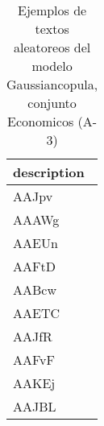 \begin{table}[H]
\centering
\fontsize{8}{14}\selectfont
\caption{Ejemplos de textos aleatoreos del modelo Gaussiancopula, conjunto Economicos (A-3)}
\label{table-sample10-economicos-a-3-gaussiancopula-text}
\begin{tabular}{|m{50em}|}
\hline
\rowcolor[gray]{0.8}
description \\
\hline AAJpv \\
\hline AAAWg \\
\hline AAEUn \\
\hline AAFtD \\
\hline AABcw \\
\hline AAETC \\
\hline AAJfR \\
\hline AAFvF \\
\hline AAKEj \\
\hline AAJBL \\
\hline
\end{tabular}
\end{table}

